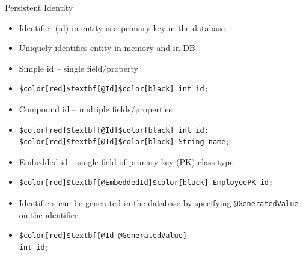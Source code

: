 \documentclass[10pt,xcolor=pdflatex]{beamer}
\begin{document}
\begin{frame}[fragile]{Persistent Identity}
	\begin{itemize}
		\item Identifier (id) in entity is a primary key in the database
		\item Uniquely identifies entity in memory and in DB
		\vspace{0.25cm}
        \item Simple id -- single field/property
        \item[] \begin{Verbatim}[fontsize=\footnotesize, commandchars=$\[\]]
$color[red]$textbf[@Id]$color[black] int id;          
          	\end{Verbatim}
		\item Compound id -- multiple fields/properties
        \item[] \begin{Verbatim}[fontsize=\footnotesize, commandchars=$\[\]]
$color[red]$textbf[@Id]$color[black] int id;
$color[red]$textbf[@Id]$color[black] String name;
            \end{Verbatim}
        \item Embedded id -- single field of primary key (PK) class type
        \item[] \begin{Verbatim}[fontsize=\footnotesize, commandchars=$\[\]]
$color[red]$textbf[@EmbeddedId]$color[black] EmployeePK id;            
\end{Verbatim}
        \vspace{0.25cm}
        \item Identifiers can be generated in the database by specifying \texttt{@GeneratedValue} on the identifier
        \item[] \begin{Verbatim}[fontsize=\footnotesize, commandchars=$\[\]]
$color[red]$textbf[@Id @GeneratedValue]
int id;          
            \end{Verbatim}
	\end{itemize}
\end{frame}
\end{document}
